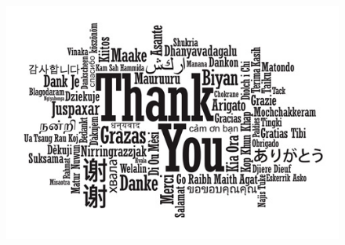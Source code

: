 \documentclass{beamer}
\begin{document}
\begin{frame}
	\begin{figure}
		\includegraphics[height=0.6\textheight]{thank-you}
	\end{figure}
\end{frame}
\end{document}
